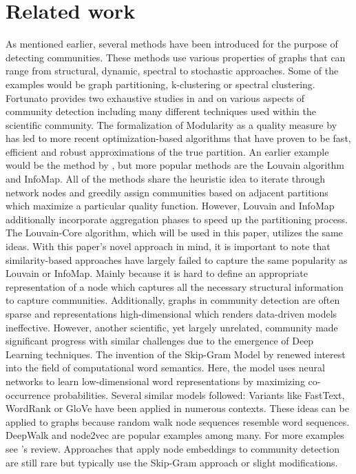\documentclass[11pt, twocolumn]{article}
\begin{document}
\section{Related work}
\label{sec:rel_work}
As mentioned earlier, several methods have been introduced for the purpose of detecting communities.\cite{fortunato_CommunityDetectionGraphs_2010} These methods use various properties of graphs that can range from structural, dynamic, spectral to stochastic approaches. Some of the examples would be graph partitioning, k-clustering or spectral clustering. Fortunato provides two exhaustive studies in \citeyear{fortunato_CommunityDetectionGraphs_2010} and \citeyear{fortunato_CommunityDetectionNetworks_2016} on various aspects of community detection including many different techniques used within the scientific community. The formalization of Modularity as a quality measure by \citeauthor{newman_FindingEvaluatingCommunity_2004} has led to more recent optimization-based algorithms that have proven to be fast, efficient and robust approximations of the true partition.\citeyear{fortunato_CommunityDetectionGraphs_2010} An earlier example would be the method by \citeauthor{clauset_FindingCommunityStructure_2004}, but more popular methods are the Louvain algorithm and InfoMap. All of the methods share the heuristic idea to iterate through network nodes and greedily assign communities based on adjacent partitions which maximize a particular quality function. However, Louvain and InfoMap additionally incorporate aggregation phases to speed up the partitioning process. The Louvain-Core algorithm, which will be used in this paper, utilizes the same ideas. With this paper's novel approach in mind, it is important to note that similarity-based approaches have largely failed to capture the same popularity as Louvain or InfoMap. Mainly because it is hard to define an appropriate representation of a node which captures all the necessary structural information to capture communities. Additionally, graphs in community detection are often sparse and representations high-dimensional which renders data-driven models ineffective.\cite{cai_ComprehensiveSurveyGraph_2018} However, another scientific, yet largely unrelated, community made significant progress with similar challenges due to the emergence of Deep Learning techniques. The invention of the Skip-Gram Model by \citeauthor{mikolov_DistributedRepresentationsWords_2013} renewed interest into the field of computational word semantics.\cite{mikolov_DistributedRepresentationsWords_2013} Here, the model uses neural networks to learn low-dimensional word representations by maximizing co-occurrence probabilities. Several similar models followed: Variants like FastText, WordRank or GloVe have been applied in numerous contexts.\cite{alvarez_ReviewWordEmbedding_} These ideas can be applied to graphs because random walk node sequences resemble word sequences. DeepWalk and node2vec are popular examples among many. For more examples see \citeauthor{cai_ComprehensiveSurveyGraph_2018}'s review.\cite{cai_ComprehensiveSurveyGraph_2018} Approaches that apply node embeddings to community detection are still rare but typically use the Skip-Gram approach or slight modifications. 
\end{document}
